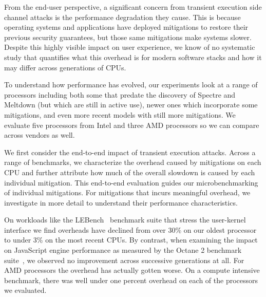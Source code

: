 
From the end-user perspective, a significant concern from transient execution side channel attacks is the performance degradation they cause.
This is because operating systems and applications have deployed mitigations to restore their previous security guarantees, but those same mitigations make systems slower.
Despite this highly visible impact on user experience, we know of no systematic study that quantifies what this overhead is for modern software stacks and how it may differ across generations of CPUs.

To understand how performance has evolved, our experiments look at a range of processors including both some that predate the discovery of Spectre and Meltdown (but which are still in active use), newer ones which incorporate some mitigations, and even more recent models with still more mitigations.
We evaluate five processors from Intel and three AMD processors so we can compare across vendors as well.

We first consider the end-to-end impact of transient execution attacks.
Across a range of benchmarks, we characterize the overhead caused by mitigations on each CPU and further attribute how much of the overall slowdown is caused by each individual mitigation.
This end-to-end evaluation guides our microbenchmarking of individual mitigations.
For mitigations that incurs meaningful overhead, we investigate in more detail to understand their performance characteristics.

On workloads like the LEBench~\cite{ren:lebench} benchmark suite that stress the user-kernel interface we find overheads have declined from over 30\% on our oldest processor to under 3\% on the most recent CPUs.
By contrast, when examining the impact on JavaScript engine performance as measured by the Octane 2 benchmark suite~\cite{google:octane2}, we observed no improvement across successive generations at all.
For AMD processors the overhead has actually gotten worse.
On a compute intensive benchmark, there was well under one percent overhead on each of the processors we evaluated.

